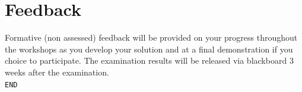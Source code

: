 \documentclass[11pt]{article}
\begin{document}
\section{Feedback}

Formative (non assessed) feedback will be provided on your progress throughout the workshops as you develop your solution and at a final demonstration if you choice to participate. 
The examination results will be released via blackboard 3 weeks after the examination.\\

\noindent \texttt{END}
\end{document}
